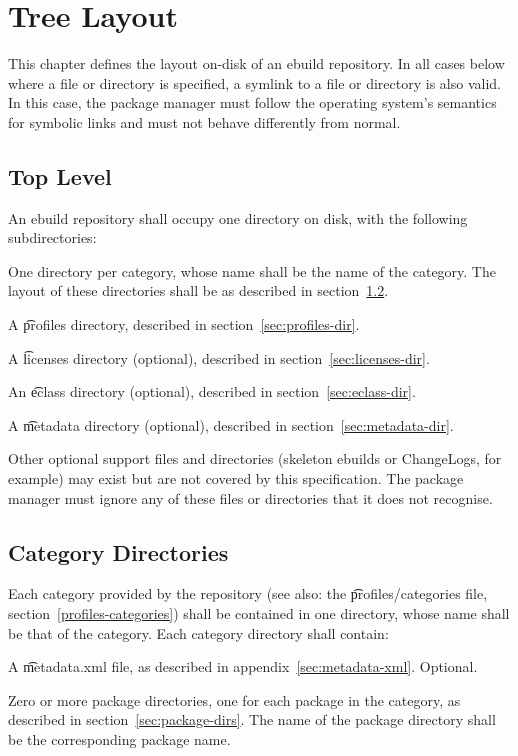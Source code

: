 \chapter{Tree Layout}

This chapter defines the layout on-disk of an ebuild repository. In all cases below where a file or
directory is specified, a symlink to a file or directory is also valid. In this case, the package
manager must follow the operating system's semantics for symbolic links and must not behave
differently from normal.

\section{Top Level}

An ebuild repository shall occupy one directory on disk, with the following subdirectories:
\begin{compactitem}
\item One directory per category, whose name shall be the name of the category. The layout of
    these directories shall be as described in section~\ref{sec:category-dirs}.
\item A \t{profiles} directory, described in section~\ref{sec:profiles-dir}.
\item A \t{licenses} directory (optional), described in section~\ref{sec:licenses-dir}.
\item An \t{eclass} directory (optional), described in section~\ref{sec:eclass-dir}.
\item A \t{metadata} directory (optional), described in section~\ref{sec:metadata-dir}.
\item Other optional support files and directories (skeleton ebuilds or ChangeLogs,
    for example) may exist but are not covered by this specification. The package manager must
    ignore any of these files or directories that it does not recognise.

\end{compactitem}

\section{Category Directories}
\label{sec:category-dirs}

Each category provided by the repository (see also: the
\t{profiles/categories} file, section~\ref{profiles-categories}) shall
be contained in one directory, whose name shall be that of the
category. Each category directory shall contain:
\begin{compactitem}
\item A \t{metadata.xml} file, as described in appendix~\ref{sec:metadata-xml}\@. Optional.
\item Zero or more package directories, one for each package in the
  category, as described in section~\ref{sec:package-dirs}. The name of
  the package directory shall be the corresponding package name.
\end{compactitem}

